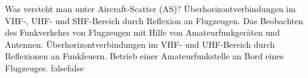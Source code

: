     {Was versteht man unter Aircraft-Scatter (AS)?}
    {Überhorizontverbindungen im VHF-, UHF- und SHF-Bereich durch Reflexion an Flugzeugen.}
    {Das Beobachten des Funkverkehrs von Flugzeugen mit Hilfe von Amateurfunkgeräten und Antennen.}
    {Überhorizontverbindungen im VHF- und UHF-Bereich durch Reflexionen an Funkfeuern.}
    {Betrieb einer Amateurfunkstelle an Bord eines Flugzeuges.}
    {false}{false}